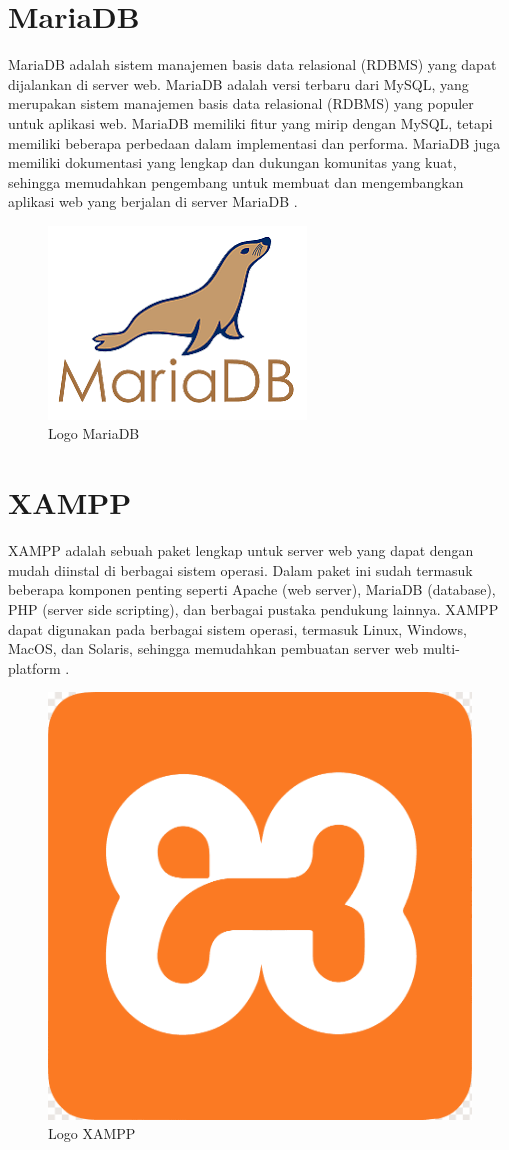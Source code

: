 \section{MariaDB}
MariaDB adalah sistem manajemen basis data relasional (RDBMS) yang dapat dijalankan di server web. MariaDB adalah versi terbaru dari MySQL, yang merupakan sistem manajemen basis data relasional (RDBMS) yang populer untuk aplikasi web. MariaDB memiliki fitur yang mirip dengan MySQL, tetapi memiliki beberapa perbedaan dalam implementasi dan performa. MariaDB juga memiliki dokumentasi yang lengkap dan dukungan komunitas yang kuat, sehingga memudahkan pengembang untuk membuat dan mengembangkan aplikasi web yang berjalan di server MariaDB \cite{mariadb2024}.

\begin{figure}
	\centering
	\includegraphics[width=0.20\linewidth]{konten//gambar/logo-mariadb.png}
	\caption{Logo MariaDB}
	\label{fig:enter-label}
\end{figure}

\section{XAMPP}
XAMPP adalah sebuah paket lengkap untuk server web yang dapat dengan mudah diinstal di berbagai sistem operasi. Dalam paket ini sudah termasuk beberapa komponen penting seperti Apache (web server), MariaDB (database), PHP (server side scripting), dan berbagai pustaka pendukung lainnya. XAMPP dapat digunakan pada berbagai sistem operasi, termasuk Linux, Windows, MacOS, dan Solaris, sehingga memudahkan pembuatan server web multi-platform \cite{pakpahan2020sistem}.

\begin{figure}
	\centering
	\includegraphics[width=0.20\linewidth]{konten//gambar/logo-xampp.png}
	\caption{Logo XAMPP}
	\label{fig:enter-label}
\end{figure}